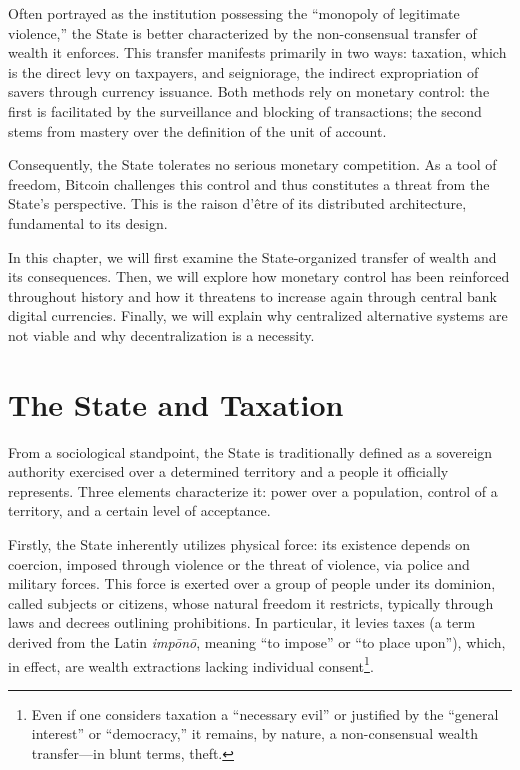 \documentclass[
  a5paper,
  smalldemyvopaper,10pt,twoside,onecolumn,openright,extrafontsizes,hidelinks]{memoir}
\begin{document}
Often portrayed as the institution possessing the ``monopoly of
legitimate violence,'' the State is better characterized by the
non-consensual transfer of wealth it enforces. This transfer manifests
primarily in two ways: taxation, which is the direct levy on taxpayers,
and seigniorage, the indirect expropriation of savers through currency
issuance. Both methods rely on monetary control: the first is
facilitated by the surveillance and blocking of transactions; the second
stems from mastery over the definition of the unit of account.

Consequently, the State tolerates no serious monetary competition. As a
tool of freedom, Bitcoin challenges this control and thus constitutes a
threat from the State's perspective. This is the raison d'être of its
distributed architecture, fundamental to its design.

In this chapter, we will first examine the State-organized transfer of
wealth and its consequences. Then, we will explore how monetary control
has been reinforced throughout history and how it threatens to increase
again through central bank digital currencies. Finally, we will explain
why centralized alternative systems are not viable and why
decentralization is a necessity.

\section*{The State and Taxation}\label{luxe9tat-et-limpuxf4t}


From a sociological standpoint, the State is traditionally defined as a
sovereign authority exercised over a determined territory and a people
it officially represents. Three elements characterize it: power over a
population, control of a territory, and a certain level of acceptance.

Firstly, the State inherently utilizes physical force: its existence
depends on coercion, imposed through violence or the threat of violence,
via police and military forces. This force is exerted over a group of
people under its dominion, called subjects or citizens, whose natural
freedom it restricts, typically through laws and decrees outlining
prohibitions. In particular, it levies taxes (a term derived from the
Latin \emph{impōnō}, meaning ``to impose'' or ``to place upon''), which,
in effect, are wealth extractions lacking individual consent\footnote{Even
  if one considers taxation a ``necessary evil'' or justified by the
  ``general interest'' or ``democracy,'' it remains, by nature, a
  non-consensual wealth transfer---in blunt terms, theft.}.
\end{document}
